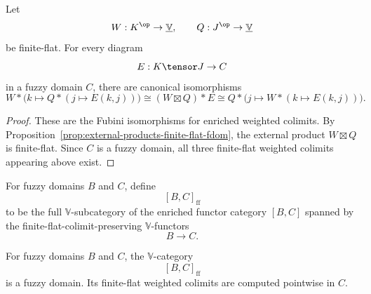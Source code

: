 \begin{proposition}
\label{prop:finite-flat-fubini-fdom}
Let
\[
    W:K^{\op}\to\underline{\mathbb V},
    \qquad
    Q:J^{\op}\to\underline{\mathbb V}
\]
be finite-flat.  For every diagram
\[
    E:K\tensor J\to C
\]
in a fuzzy domain \(C\), there are canonical isomorphisms
\[
    W*\bigl(k\mapsto Q*(j\mapsto E(k,j))\bigr)
    \cong
    (W\boxtimes Q)*E
    \cong
    Q*\bigl(j\mapsto W*(k\mapsto E(k,j))\bigr).
\]
\end{proposition}

\begin{proof}
These are the Fubini isomorphisms for enriched weighted colimits.  By
Proposition~\ref{prop:external-products-finite-flat-fdom}, the external product
\(W\boxtimes Q\) is finite-flat.  Since \(C\) is a fuzzy domain, all three
finite-flat weighted colimits appearing above exist.
\end{proof}

\begin{definition}
\label{def:internal-hom-fdom}
For fuzzy domains \(B\) and \(C\), define
\[
    [B,C]_{\mathrm{ff}}
\]
to be the full \(\mathbb V\)-subcategory of the enriched functor category
\([B,C]\) spanned by the finite-flat-colimit-preserving \(\mathbb V\)-functors
\[
    B\to C.
\]
\end{definition}

\begin{proposition}
\label{prop:internal-homs-fdom}
For fuzzy domains \(B\) and \(C\), the \(\mathbb V\)-category
\[
    [B,C]_{\mathrm{ff}}
\]
is a fuzzy domain.  Its finite-flat weighted colimits are computed pointwise in
\(C\).
\end{proposition}

